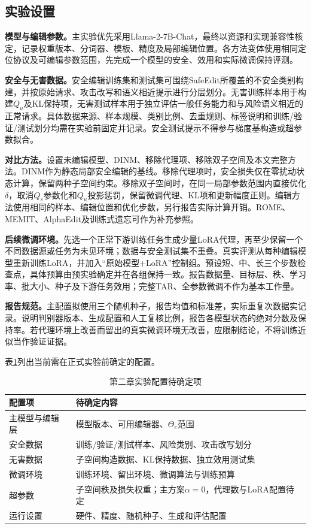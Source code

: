 \subsection{实验设置}

\textbf{模型与编辑参数。}主实验优先采用Llama-2-7B-Chat\cite{touvron2023llama2}，最终以资源和实现兼容性核定，记录权重版本、分词器、模板、精度及局部编辑位置。各方法变体使用相同定位协议及可编辑参数范围，先完成一个模型的安全、效用和实际微调保持评测。

\textbf{安全与无害数据。}安全编辑训练集和测试集可围绕SafeEdit所覆盖的不安全类别构建，并按原始请求、攻击改写和语义相近提示进行分层划分\cite{wang2024safeedit}。无害训练样本用于构建$Q_u$及KL保持项，无害测试样本用于独立评估一般任务能力和与风险语义相近的正常请求。具体数据来源、样本规模、类别比例、去重规则、标签说明和训练/验证/测试划分均需在实验前固定并记录。安全测试提示不得参与梯度基构造或超参数拟合。

\textbf{对比方法。}设置未编辑模型、DINM、移除代理项、移除双子空间及本文完整方法。DINM作为静态局部安全编辑的基线\cite{wang2024safeedit}。移除代理项时，安全损失仅在零扰动状态计算，保留两种子空间约束。移除双子空间时，在同一局部参数范围内直接优化$\delta$，取消$Q_s$参数化和$Q_u$投影惩罚，保留微调代理、KL项和更新幅度正则。编辑方法使用相同的样本、编辑位置和优化步数，另行报告实际计算开销。ROME、MEMIT、AlphaEdit及训练式遗忘可作为补充参照。

\textbf{后续微调环境。}先选一个正常下游训练任务生成少量LoRA代理，再至少保留一个不同数据源或任务为未见环境；数据与安全测试集不重叠。真实评测从每种编辑模型重新训练LoRA，并加入“原始模型+LoRA”控制组。预设短、中、长三个步数检查点，具体预算由预实验确定并在各组保持一致。报告数据量、目标层、秩、学习率、批大小、种子及下游任务效用；完整TAR、全参数微调不作为基本工作量。

\textbf{报告规范。}主配置拟使用三个随机种子，报告均值和标准差，实际重复次数据实记录。说明判别器版本、生成配置和人工复核比例，报告各模型状态的绝对分数及保持率。若代理环境上改善而留出的真实微调环境无改善，应限制结论，不将训练近似当作验证证据。

表\ref{tab:ch2-config-todo}列出当前需在正式实验前确定的配置。
\begin{table}[htbp]
  \centering
  \caption{第二章实验配置待确定项}
  \label{tab:ch2-config-todo}
  \begin{tabular}{p{}p{}}
    \hline
    配置项 & 待确定内容 \\ \hline
    主模型与编辑层 & 模型版本、可用编辑器、$\Theta_e$范围 \\
    安全数据 & 训练/验证/测试样本、风险类别、攻击改写划分 \\
    无害数据 & 子空间构造数据、KL保持数据、独立效用测试集 \\
    微调环境 & 训练环境、留出环境、微调算法与训练预算 \\
    超参数 & 子空间秩及损失权重；主方案$\alpha=0$，代理数与LoRA配置待定 \\
    运行设置 & 硬件、精度、随机种子、生成和评估配置 \\
    \hline
  \end{tabular}
\end{table}

